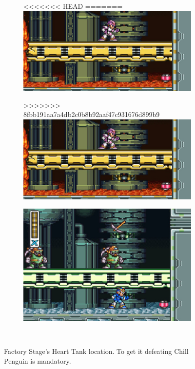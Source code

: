 \begin{figure}[h]
	\centering
	\begin{subfigure}{0.49\textwidth}
<<<<<<< HEAD
=======
		\centering
		\includegraphics[width=\linewidth]{figures/X1/Flame_heart_1.jpg}
		\caption{}
	\end{subfigure}
	\begin{subfigure}{0.5\textwidth}
>>>>>>> 8fbb191aa7a4db2c0b8b92aaf47c931676d899b9
		\centering
		\includegraphics[width=\linewidth]{figures/X1/Flame_mammoth/Flame_heart_1.jpg}
		\caption{}
	\end{subfigure}
	\begin{subfigure}{0.4\textwidth}
		\centering
		\includegraphics[width=\linewidth]{figures/X1/Flame_mammoth/Flame_heart_2.jpg}
		\caption{}
	\end{subfigure}\\
	\caption{Factory Stage's Heart Tank location. To get it defeating Chill Penguin is mandatory.}
\end{figure}

